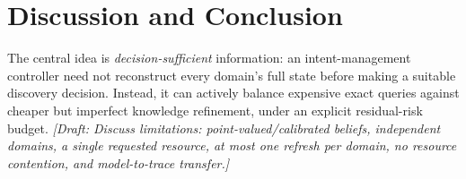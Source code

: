 \documentclass[conference]{IEEEtran}
\newcommand{\TODO}[1]{\textit{[Draft: #1]}}
\begin{document}
\section{Discussion and Conclusion}
\label{sec:discussion}
The central idea is \emph{decision-sufficient} information: an
intent-management controller need not reconstruct every domain's full
state before making a suitable discovery decision. Instead, it can
actively balance expensive exact queries against cheaper but imperfect
knowledge refinement, under an explicit residual-risk budget.
\TODO{Discuss limitations: point-valued/calibrated beliefs,
independent domains, a single requested resource, at most one refresh
per domain, no resource contention, and model-to-trace transfer.}

\end{document}
